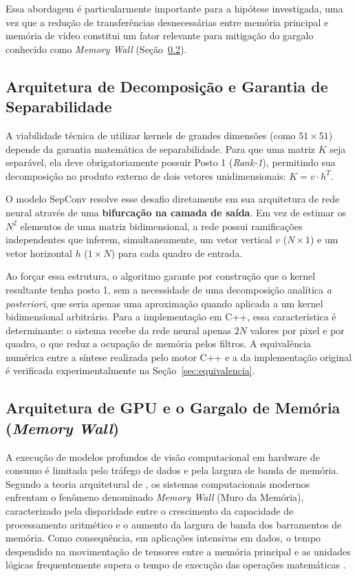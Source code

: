\documentclass[
    12pt,                %
    openright,           %
    oneside,             %
    a4paper,             %
    english,             %
    brazil               %
]{abntex2}
\begin{document}
Essa abordagem é particularmente importante para a hipótese investigada, uma vez que a redução de transferências desnecessárias entre memória principal e memória de vídeo constitui um fator relevante para mitigação do gargalo conhecido como \textit{Memory Wall} (Seção~\ref{sec:memory_wall}).


\subsection{Arquitetura de Decomposição e Garantia de Separabilidade}

A viabilidade técnica de utilizar kernels de grandes dimensões (como $51 \times 51$) depende da garantia matemática de separabilidade. Para que uma matriz $K$ seja separável, ela deve obrigatoriamente possuir Posto 1 (\textit{Rank-1}), permitindo sua decomposição no produto externo de dois vetores unidimensionais: $K = v \cdot h^T$.

O modelo SepConv resolve esse desafio diretamente em sua arquitetura de rede neural através de uma \textbf{bifurcação na camada de saída}. Em vez de estimar os $N^2$ elementos de uma matriz bidimensional, a rede possui ramificações independentes que inferem, simultaneamente, um vetor vertical $v$ ($N \times 1$) e um vetor horizontal $h$ ($1 \times N$) para cada quadro de entrada.

Ao forçar essa estrutura, o algoritmo garante por construção que o kernel resultante tenha posto 1, sem a necessidade de uma decomposição analítica \textit{a posteriori}, que seria apenas uma aproximação quando aplicada a um kernel bidimensional arbitrário. Para a implementação em C++, essa característica é determinante: o sistema recebe da rede neural apenas $2N$ valores por pixel e por quadro, o que reduz a ocupação de memória pelos filtros. A equivalência numérica entre a síntese realizada pelo motor C++ e a da implementação original é verificada experimentalmente na Seção~\ref{sec:equivalencia}.

\subsection{Arquitetura de GPU e o Gargalo de Memória (\textit{Memory Wall})}
\label{sec:memory_wall}

A execução de modelos profundos de visão computacional em hardware de consumo é limitada pelo tráfego de dados e pela largura de banda de memória. Segundo a teoria arquitetural de , os sistemas computacionais modernos enfrentam o fenômeno denominado \textit{Memory Wall} (Muro da Memória), caracterizado pela disparidade entre o crescimento da capacidade de processamento aritmético e o aumento da largura de banda dos barramentos de memória. Como consequência, em aplicações intensivas em dados, o tempo despendido na movimentação de tensores entre a memória principal e as unidades lógicas frequentemente supera o tempo de execução das operações matemáticas \cite{Hennessy2022}.
\end{document}
